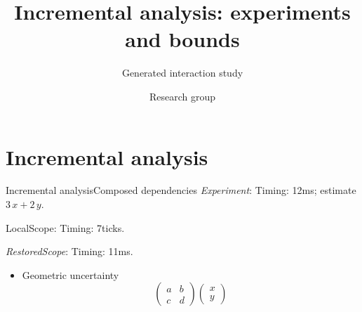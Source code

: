 \documentclass[9pt,aspectratio=43]{beamer}
\title{Incremental analysis: experiments and bounds}
\subtitle{Generated interaction study}
\author{Research group}
\date{}
\newcommand{\fuzzlayerA}[1]{\textit{#1}}
\newcommand{\fuzzlayerB}[1]{\fuzzlayerA{#1}}
\newcommand{\fuzzterm}[1]{\fuzzlayerB{#1}}
\newcommand{\fuzzpair}[2]{\fuzzterm{#1}: #2}
\newcommand{\fuzzunit}{ms}
\newcommand{\fuzzcoefficient}{3}
\newcommand{\fuzzscale}[2][\fuzzcoefficient]{#1\,#2}
\begin{document}
\section{Incremental analysis}
\begin{frame}[t,shrink=5]{Incremental analysis}{Composed dependencies}
\fuzzpair{Experiment}{Timing: 12\fuzzunit; estimate $\fuzzscale{x}+\fuzzscale[2]{y}$.}\par
{\renewcommand{\fuzzunit}{ticks}\let\fuzzterm\textrm\fuzzpair{LocalScope}{Timing: 7\fuzzunit.}\par}
\fuzzpair{RestoredScope}{Timing: 11\fuzzunit.}\par
\begin{itemize}
\item<1-> \begin{exampleblock}{Geometric uncertainty}
\[\begin{pmatrix}a&b\\c&d\end{pmatrix}\begin{pmatrix}x\\y\end{pmatrix}\]
\end{exampleblock}
\par
{}
\end{itemize}
\end{frame}
\end{document}
